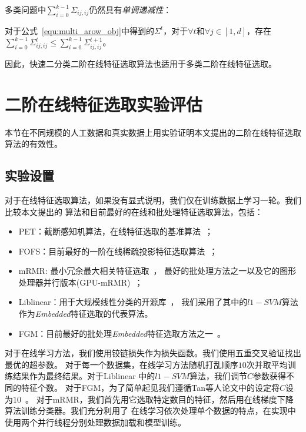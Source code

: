\documentclass[doctor]{ustcthesis}
\begin{document}
多类问题中$\sum_{i=0}^{k-1}\Sigma_{ij,ij}$仍然具有\emph{单调递减性}：
\begin{proposition}[单调递减性]
    对于公式~\eqref{equ:multi_arow_obj}中得到的$\Sigma^t$，对于$\forall
    t$和$\forall j \in [1,d]$，存在
    $\sum_{i=0}^{k-1}\Sigma^{t}_{ij,ij} \leq
    \sum_{i=0}^{k-1}\Sigma^{t+1}_{ij,ij}$。
\end{proposition}
因此，快速二分类二阶在线特征选取算法也适用于多类二阶在线特征选取。

\section{二阶在线特征选取实验评估}
本节在不同规模的人工数据和真实数据上用实验证明本文提出的二阶在线特征选取算法的有效性。

\subsection{实验设置}
对于在线特征选取算法，如果没有显式说明，我们仅在训练数据上学习一轮。我们比较本文提出的
算法和目前最好的在线和批处理特征选取算法，包括：
\begin{itemize}
    \item PET：截断感知机算法，在线特征选取的基准算法~\cite{wang2014online}；
    \item FOFS：目前最好的一阶在线稀疏投影特征选取算法~\cite{wang2014online}；
    \item mRMR: 最小冗余最大相关特征选取~\cite{peng2005feature}，
        最好的批处理方法之一以及它的图形处理器并行版本(GPU-mRMR)~\cite{ramirez2016fast}；
    \item Liblinear：用于大规模线性分类的开源库~\cite{fan2008liblinear}，
        我们采用了其中的$l1-SVM$算法作为\emph{Embedded}特征选取的代表算法。 \item
        FGM：目前最好的批处理\emph{Embedded}特征选取方法之一~\cite{tantw14fgm}。
\end{itemize}

对于在线学习方法，我们使用铰链损失作为损失函数。我们使用五重交叉验证找出最优的超参数。
对于每一个数据集，在线学习方法随机打乱顺序$10$次并取平均训练结果作为最终结果。对于Liblinear
中的$l1-SVM$算法，我们调节$C$参数获得不同的特征个数。
对于FGM，为了简单起见我们遵循Tan等人论文中的设定将$C$设为$10$~\cite{tantw14fgm}。
对于mRMR，我们首先用它选取特定数目的特征，然后用在线梯度下降算法训练分类器。我们充分利用了
在线学习依次处理单个数据的特点，在实现中使用两个并行线程分别处理数据加载和模型训练。
\end{document}
